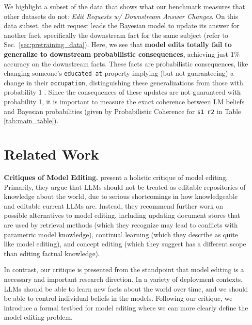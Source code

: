 \documentclass[11pt,a4paper]{article}
\begin{document}
We highlight a subset of the data that shows what our benchmark measures that other datasets do not: \textit{Edit Requests w/ Downstream Answer Changes}. On this data subset, the edit request leads the Bayesian model to update its answer for another fact, specifically the downstream fact for the same subject (refer to Sec.~\ref{sec:pretraining_data}). Here, we see that \textbf{model edits totally fail to generalize to downstream probabilistic consequences}, achieving just 1\% accuracy on the downstream facts. These facts are probabilistic consequences, like changing someone's \texttt{educated at} property implying (but not guaranteeing) a change in their \texttt{occupation}, distinguishing these generalizations from those with probability 1 \citep{zhong2023mquake, cohen2024evaluating}. 
Since the consequences of these updates are not guaranteed with probability 1, it is important to measure the exact coherence between LM beliefs and Bayesian probabilities (given by Probabilistic Coherence for \texttt{s1 \hspace{-7pt} r2} in Table \ref{tab:main_table}). 

\section{Related Work}
\label{sec:related_work}

\noindent\textbf{Critiques of Model Editing.} \citet{pinter-elhadad-2023-emptying} present a holistic critique of model editing. Primarily, they argue that LLMs should not be treated as editable repositories of knowledge about the world, due to serious shortcomings in how knowledgeable and editable current LLMs are. Instead, they recommend further work on possible alternatives to model editing, including updating document stores that are used by retrieval methods (which they recognize may lead to conflicts with parametric model knowledge), continual learning (which they describe as quite like model editing), and concept editing (which they suggest has a different scope than editing factual knowledge). 

In contrast, our critique is presented from the standpoint that model editing is a necessary and important research direction. In a variety of deployment contexts, LLMs should be able to learn new facts about the world over time, and we should be able to control individual beliefs in the models. Following our critique, we introduce a formal testbed for model editing where we can more clearly define the model editing problem.
\end{document}
